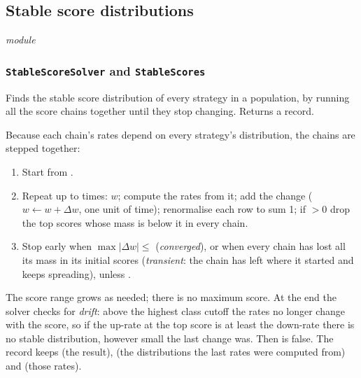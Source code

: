 \exh
{}

\subsection{Stable score distributions}\label{sec:solver}\emph{module} 

\subsubsection{\texttt{StableScoreSolver} and \texttt{StableScores}}

\whatit
Finds the stable score distribution of every strategy in a population, by running all the score chains together until
they stop changing. Returns a  record.

\howit
Because each chain's rates depend on every strategy's distribution, the chains are stepped together:
\begin{enumerate}
\item Start from .
\item Repeat up to  times:  $w$; compute the rates from it; add the change
($w\leftarrow w+\Delta w$, one unit of time); renormalise each row to sum 1; if ${}>0$ drop the top
scores whose mass is below it in every chain.
\item Stop early when $\max|\Delta w|\le$ (\emph{converged}), or when every chain has lost all its mass in its initial
scores (\emph{transient}: the chain has left where it started and keeps spreading), unless .
\end{enumerate}
The score range grows as needed; there is no maximum score. At the end the solver checks for \emph{drift}: above the
highest class cutoff the rates no longer change with the score, so if the up-rate at the top score is at least the
down-rate there is no stable distribution, however small the last change was. Then  is false.
The record keeps  (the result),  (the distributions the last rates were computed from) and
 (those rates).

